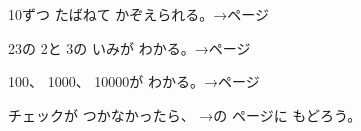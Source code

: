 \begin{furikaeri}
\begin{checklist}
\item 10ずつ たばねて かぞえられる。\hfill{\footnotesize\sffamily\color{bkTheme}→\pageref{bk:1-2:tabaneru}ページ}
\item 23の 2と 3の いみが わかる。\hfill{\footnotesize\sffamily\color{bkTheme}→\pageref{bk:1-2:kurai}ページ}
\item 100、 1000、 10000が わかる。\hfill{\footnotesize\sffamily\color{bkTheme}→\pageref{bk:1-2:hyaku}ページ}
\end{checklist}
チェックが つかなかったら、 →の ページに もどろう。
\end{furikaeri}

\clearpage
